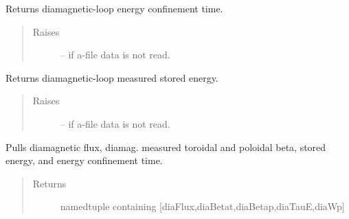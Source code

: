 \documentclass[letterpaper,10pt,english]{sphinxmanual}
\begin{document}
\begin{fulllineitems}
\begin{fulllineitems}
\begin{quote}
\begin{description}
\end{description}\end{quote}

\end{fulllineitems}


\begin{fulllineitems}
\label{eqtools:eqtools.eqdskreader.EqdskReader.getDiamagTauE}
Returns diamagnetic-loop energy confinement time.
\begin{quote}\begin{description}
\item[{Raises }] \leavevmode
{} -- 
if a-file data is not read.

\end{description}\end{quote}

\end{fulllineitems}


\begin{fulllineitems}
\label{eqtools:eqtools.eqdskreader.EqdskReader.getDiamagWp}
Returns diamagnetic-loop measured stored energy.
\begin{quote}\begin{description}
\item[{Raises }] \leavevmode
{} -- 
if a-file data is not read.

\end{description}\end{quote}

\end{fulllineitems}


\begin{fulllineitems}
\label{eqtools:eqtools.eqdskreader.EqdskReader.getDiamag}
Pulls diamagnetic flux, diamag. measured toroidal and poloidal beta, stored energy, and energy confinement time.
\begin{quote}\begin{description}
\item[{Returns}] \leavevmode
namedtuple containing {[}diaFlux,diaBetat,diaBetap,diaTauE,diaWp{]}


\end{description}
\end{quote}
\end{fulllineitems}
\end{fulllineitems}
\end{document}
